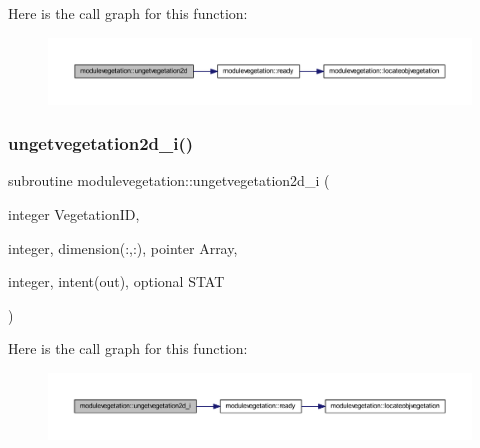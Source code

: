Here is the call graph for this function\+:\nopagebreak
\begin{figure}[H]
\begin{center}
\leavevmode
\includegraphics[width=350pt]{namespacemodulevegetation_a2ffe279db4531dedb2c50c6349246a00_cgraph}
\end{center}
\end{figure}
\mbox{\label{namespacemodulevegetation_a51242f691596a8990eaffb93f189b5ab}} 
\subsubsection{\texorpdfstring{ungetvegetation2d\+\_\+i()}{ungetvegetation2d\_i()}}
{\footnotesize\ttfamily subroutine modulevegetation\+::ungetvegetation2d\+\_\+i (\begin{DoxyParamCaption}\item[{integer}]{Vegetation\+ID,  }\item[{integer, dimension(\+:,\+:), pointer}]{Array,  }\item[{integer, intent(out), optional}]{S\+T\+AT }\end{DoxyParamCaption})\hspace{0.3cm}{\ttfamily [private]}}

Here is the call graph for this function\+:\nopagebreak
\begin{figure}[H]
\begin{center}
\leavevmode
\includegraphics[width=350pt]{namespacemodulevegetation_a51242f691596a8990eaffb93f189b5ab_cgraph}
\end{center}
\end{figure}
\mbox{\label{namespacemodulevegetation_ae3b94dadad52bcad92f73e4358946cda}} 
